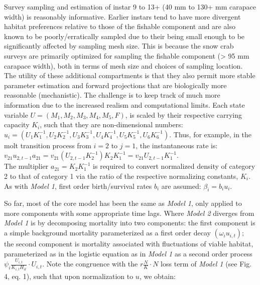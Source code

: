 \documentclass[
	letterpaper, %
	10pt, %
]{article}
\begin{document}
Survey sampling and estimation of instar 9 to 13+ (40 mm to 130+ mm
carapace width) is reasonably informative. Earlier instars tend to have more divergent
habitat preferences relative to those of the fishable component and
are also known to be poorly/erratically sampled due to their being
small enough to be significantly affected by sampling mesh size. This
is because the snow crab surveys are primarily optimized for sampling
the fishable component (\textgreater{} 95 mm carapace width), both in terms
of mesh size and choices of sampling location. The utility of these
additional compartments is that they also permit more stable parameter
estimation and forward projections that are biologically more reasonable
(mechanistic). The challenge is to keep track of much more information
due to the increased realism and computational limits. Each state
variable $U={({M_{1},M_{2},M_{3},M_{4},M_{5},F})}$, is scaled by their respective carrying capacity $K_{i}$, such that they are non-dimensional numbers: 
${u_{i}={({U_{1}K_{1}^{-1},U_{2}K_{2}^{-1},U_{3}K_{3}^{-1},U_{4}K_{4}^{-1},U_{5}K_{5}^{-1},U_{6}K_{6}^{-1}})}}.$ Thus, for example, in the molt transition process from 
$i=2$ to $j=1$, the instantaneous rate is: \\

$v_{21}u_{2,{t-1}}{a_{21}=v_{21}}{({U_{2,{t-1}}K_{2}^{-1}})}K_{2}K_{1}^{-1} = v_{21}U_{2,{t-1}}K_{1}^{-1}$. \\

The multiplier ${a_{21}=K_{2}}K_{1}^{-1}$ is required to convert normalized density of category 2 to that of category 1 via the ratio of the respective normalizing constants,
$K_{i}.$ As with \emph{Model 1}, first order birth/survival rates 
$b_{i}$ are assumed: ${\beta_{i}=b_{i}}u_{i}.$ 

So far, most of the core model has been the same as \emph{Model 1}, only
applied to more components with some appropriate time lags. Where
\emph{Model 2} diverges from \emph{Model 1} is by decomposing mortality into two
components: the first component is a simple background mortality parameterized
as a first order decay ${({\omega_{i}u_{i,t}})};$ the second component is
mortality associated with fluctuations of
viable habitat, parameterized as in the logistic equation as in \emph{Model 1} as a second
order process $\psi_{i}\frac{U_{i,t}}{K_{i,t}H_{\mathit{it}}}\cdot U_{i,t}$. Note the congruence with the $r\frac{N}{K}\cdot N$ loss term of \emph{Model 1} (see Fig. 4, eq. 1), such that upon normalization
to $u$, we obtain: \\
\end{document}
